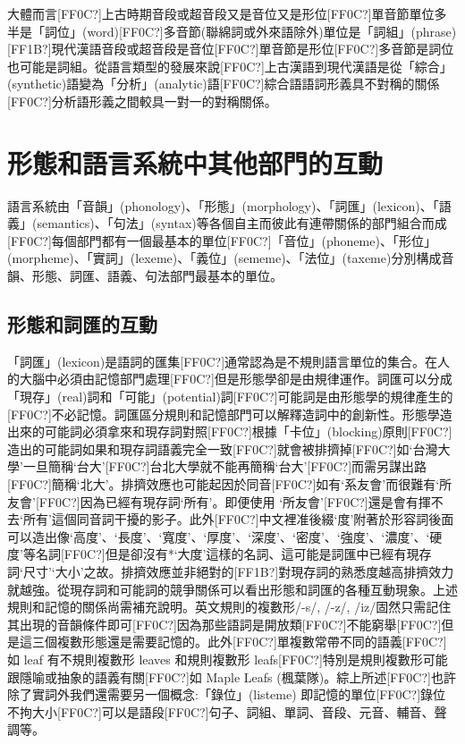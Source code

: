 \textrm{大體而言[FF0C?]上古時期音段或超音段又是音位又是形位[FF0C?]單音節單位多半是「詞位」(word)}[FF0C?]\textrm{多音節(聯綿詞或外來語除外)單位是「詞組」(phrase)}[FF1B?]\textrm{現代漢語音段或超音段是音位[FF0C?]單音節是形位[FF0C?]多音節是詞位也可能是詞組。從語言類型的發展來說[FF0C?]上古漢語到現代漢語是從「綜合」(synthetic)語變為「分析」(analytic)語[FF0C?]綜合語語詞形義具不對稱的關係[FF0C?]分析語形義之間較具一對一的對稱關係。}

\section{\rmfamily 形態和語言系統中其他部門的互動}

\textrm{語言系統由「音韻」(phonology)}、\textrm{「形態」(morphology)}、\textrm{「詞匯」(lexicon)}、\textrm{「語義」(semantics)}、\textrm{「句法」(syntax)等各個自主而彼此有連帶關係的部門組合而成[FF0C?]每個部門都有一個最基本的單位[FF0C?]「音位」(phoneme)}、\textrm{「形位」(morpheme)}、\textrm{「實詞」(lexeme)}、\textrm{「義位」(sememe)}、\textrm{「法位」(taxeme)分別構成音韻}、\textrm{形態}、\textrm{詞匯、語義、句法部門最基本的單位。}

\subsection{\rmfamily 形態和詞匯的互動}

\textrm{「詞匯」(lexicon)是語詞的匯集[FF0C?]通常認為是不規則語言單位的集合。在人的大腦中必須由記憶部門處理[FF0C?]但是形態學卻是由規律運作。詞匯可以分成「現存」(real)詞和「可能」(potential)詞[FF0C?]可能詞是由形態學的規律產生的[FF0C?]不必記憶。詞匯區分規則和記憶部門可以解釋造詞中的創新性。形態學造出來的可能詞必須拿來和現存詞對照[FF0C?]根據「卡位」(blocking)原則[FF0C?]造出的可能詞如果和現存詞語義完全一致[FF0C?]就會被排擠掉[FF0C?]如‘台灣大學’一旦簡稱‘台大’}[FF0C?]\textrm{台北大學就不能再簡稱‘台大’}[FF0C?]\textrm{而需另謀出路[FF0C?]簡稱‘北大’}。\textrm{排擠效應也可能起因於同音[FF0C?]如有‘系友會’而很難有‘所友會’}[FF0C?]\textrm{因為已經有現存詞‘所有’}。\textrm{即便使用 ‘所友會’}[FF0C?]\textrm{還是會有揮不去‘所有’這個同音詞干擾的影子。此外[FF0C?]中文裡准後綴‘度’附著於形容詞後面可以造出像‘高度’}、\textrm{‘長度’}、\textrm{‘寬度’}、\textrm{‘厚度’}、\textrm{‘深度’}、\textrm{‘密度’}、\textrm{‘強度’}、\textrm{‘濃度’}、\textrm{‘硬度’等名詞[FF0C?]但是卻沒有*‘大度’這樣的名詞、這可能是詞匯中已經有現存詞‘尺寸’‘大小’之故。排擠效應並非絕對的[FF1B?]對現存詞的熟悉度越高排擠效力就越強。從現存詞和可能詞的競爭關係可以看出形態和詞匯的各種互動現象。上述規則和記憶的關係尚需補充說明。英文規則的複數形/-s/, /-z/, /iz/固然只需記住其出現的音韻條件即可[FF0C?]因為那些語詞是開放類[FF0C?]不能窮舉[FF0C?]但是這三個複數形態還是需要記憶的。此外[FF0C?]單複數常帶不同的語義[FF0C?]如 leaf 有不規則複數形 leaves 和規則複數形 leafs}[FF0C?]\textrm{特別是規則複數形可能跟隱喻或抽象的語義有關[FF0C?]如 Maple Leafs (楓葉隊)。綜上所述[FF0C?]也許除了實詞外我們還需要另一個概念:「錄位」(listeme) 即記憶的單位[FF0C?]錄位不拘大小[FF0C?]可以是語段[FF0C?]句子、詞組、單詞、音段、元音、輔音、聲調等。}

